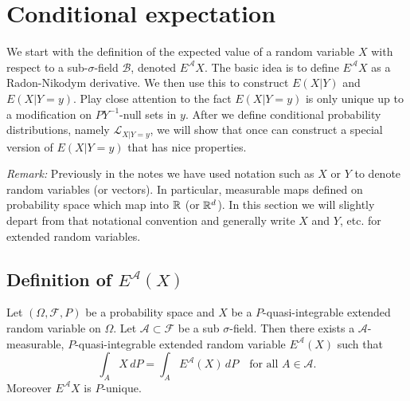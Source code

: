 \clearpage
%
%
\section{Conditional expectation}

We start with the definition of the expected value of a random variable $X$ with respect to a sub-$\sigma$-field $\mathcal B$, denoted $E^{\mathcal A}X$. The basic idea is to define $E^{\mathcal A}X$ as a Radon-Nikodym derivative. We then use this to construct $E(X|Y)$ and $E(X|Y=y)$. Play close attention to the fact $E(X|Y=y)$ is only unique up to a modification on $PY^{-1}$-null sets in $y$. After we define conditional probability distributions, namely $\mathcal L_{X|Y = y}$, we will show that once can construct a special version of $E(X|Y=y)$ that has nice properties.

{\em Remark:} Previously in the notes we have used notation such as $X$ or $Y$ to denote random variables (or vectors). In particular, measurable maps defined on probability space which map  into $\Bbb R$ (or $\Bbb R^d$). In this section we will slightly depart from that notational convention and generally write $X$ and $Y$, etc. for extended random variables.

\subsection{Definition of $E^{\mathcal A}(X)$}
\begin{theorem}
Let $(\Omega, \mathcal F, P)$ be a probability space and $X$ be a $P$-quasi-integrable extended random variable on $\Omega$. Let $\mathcal A\subset \mathcal F$ be a sub $\sigma$-field. Then there exists a
$\mathcal A$-measurable, $P$-quasi-integrable extended random variable $E^{\mathcal A}(X)$
such that
\begin{equation}
\label{eq: smooth condition}
{\int_A X\, dP = \int_A E^{\mathcal A}(X) \, dP\quad\text{for all $A\in \mathcal A$.}}
\end{equation}
Moreover $E^{\mathcal A}X$ is $P$-unique.
\end{theorem}


